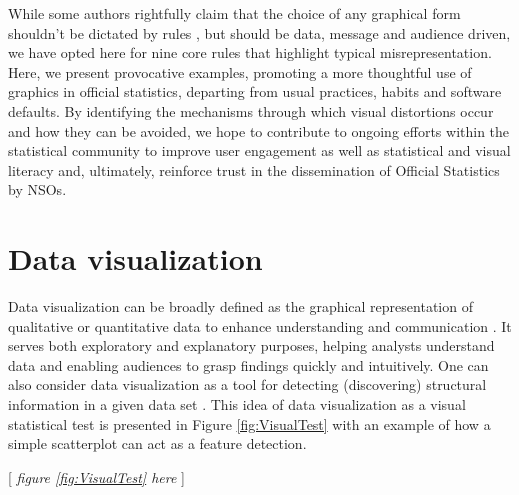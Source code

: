 \documentclass[11pt,twoside,a4paper]{article}
\begin{document}
While some authors rightfully claim that the choice of any graphical form shouldn't be dictated by rules \citep{Cairo2019}, but should be data, message and audience driven, we have opted here for nine core rules that highlight typical misrepresentation. Here, we present provocative examples, promoting a more thoughtful use of graphics in official statistics, departing from usual practices, habits and software defaults. By identifying the mechanisms through which visual distortions occur and how they can be avoided, we hope to contribute to ongoing efforts within the statistical community to improve user engagement as well as  statistical and visual literacy \citep{sabbati2022Literacy} and, ultimately, reinforce trust in the dissemination of Official Statistics by NSOs.

\section{Data visualization}

Data visualization can be broadly defined as the graphical representation of qualitative or quantitative data to enhance understanding and communication \citep{Cleveland1993Book}. It serves both exploratory and explanatory purposes, helping analysts understand data and enabling audiences to grasp findings quickly and intuitively. One can also consider data visualization as a tool for detecting (discovering) structural information in a given data set \citep{buja2009}. This idea of data visualization as a visual statistical test is presented in  Figure \ref{fig:VisualTest} with an example of how a  simple scatterplot can act as a feature detection.

\begin{center}
    [ \textit{figure \ref{fig:VisualTest}  here}  ]
\end{center}


\end{document}
